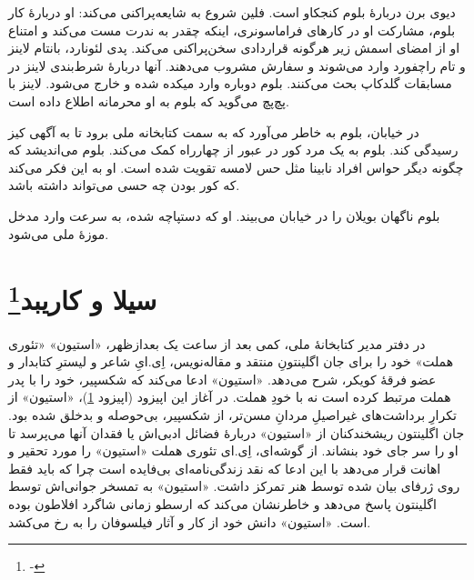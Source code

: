 \documentclass[12pt]{book}
\newcommand{\noun}[1]{«{#1}»}
\begin{document}
    دیوی برن دربارۀ بلوم کنجکاو است. فلین شروع به شایعه‌پراکنی می‌کند: او دربارۀ کار بلوم، مشارکت او در کارهای فراماسونری، اینکه چقدر به ندرت مست می‌کند و امتناع او از امضای اسمش زیر هرگونه قراردادی سخن‌پراکنی می‌کند. پدی لئونارد، بانتام لاینز و تام راچفورد وارد می‌شوند و سفارش مشروب می‌دهند. آنها دربارۀ شرط‌بندی لاینز در مسابقات گلدکاپ بحث می‌کنند. بلوم دوباره وارد میکده شده و خارج می‌شود. لاینز با پچ‌پچ می‌گوید که بلوم به او محرمانه اطلاع داده است.

    در خیابان، بلوم به خاطر می‌آورد که به سمت کتابخانه ملی برود تا به آگهی کیز رسیدگی کند. بلوم به یک مرد کور در عبور از چهارراه کمک می‌کند. بلوم می‌اندیشد که چگونه دیگر حواس افراد نابینا مثل حس لامسه تقویت شده است. او به این فکر می‌کند که کور بودن چه حسی می‌تواند داشته باشد.

    بلوم ناگهان بویلان را در خیابان می‌بیند. او که دستپاچه شده، به سرعت وارد مدخل موزۀ ملی می‌شود.

    \chapter[سیلا و کاریبد]{سیلا و کاریبد\protect\footnote{-}}\label{ep:9}
    در دفتر مدیر کتابخانۀ ملی، کمی بعد از ساعت یک بعدازظهر، \noun{استیون} «تئوری هملت» خود را برای جان اگلینتونِ منتقد و مقاله‌نویس، اِی.ایِ شاعر و لیسترِ کتابدار و عضو فرقۀ کویکر، شرح می‌دهد. \noun{استیون} ادعا می‌کند که شکسپیر، خود را با پدر هملت مرتبط کرده است نه با خودِ هملت. در آغاز این اپیزود (اپیزود \ref{ep:9})، \noun{استیون} از تکرارِ برداشت‌های غیراصیلِ مردانِ مسن‌تر، از شکسپیر، بی‌حوصله و بدخلق شده بود. جان اگلینتون ریشخندکنان از \noun{استیون} دربارۀ فضائل ادبی‌اش یا فقدان آنها می‌پرسد تا او را سر جای خود بنشاند. از گوشه‌ای، اِی.ای تئوری هملت \noun{استیون} را مورد تحقیر و اهانت قرار می‌دهد با این ادعا که نقد زندگی‌نامه‌ای بی‌فایده است چرا که باید فقط روی ژرفای بیان شده توسط هنر تمرکز داشت. \noun{استیون} به تمسخر جوانی‌اش توسط اگلینتون پاسخ می‌دهد و خاطرنشان می‌کند که ارسطو زمانی شاگرد افلاطون بوده است. \noun{استیون} دانش خود از کار و آثار فیلسوفان را به رخ می‌کشد.
\end{document}
